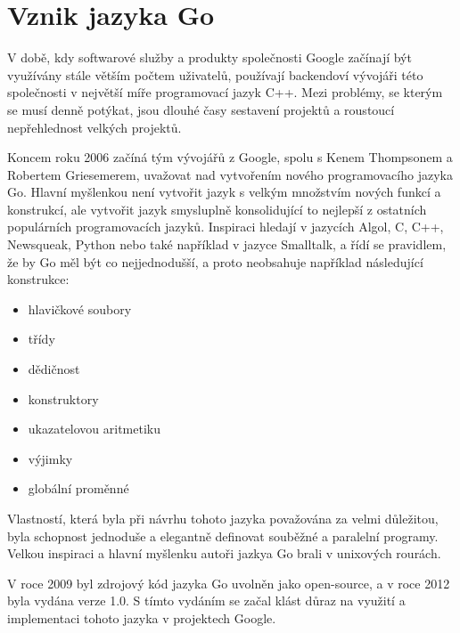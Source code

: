 \documentclass[12pt, a4paper]{article}
\let\oldsection\section
\renewcommand\section{\clearpage\oldsection}
\begin{document}
    \tableofcontents
    \pagebreak
    
    \section{Vznik jazyka Go}

 V době, kdy softwarové služby a produkty společnosti Google začínají být využívány stále větším počtem uživatelů, používají backendoví vývojáři této společnosti v největší míře programovací jazyk C++. Mezi problémy, se kterým se musí denně potýkat, jsou dlouhé časy sestavení projektů a roustoucí nepřehlednost velkých projektů.

Koncem roku 2006 začíná tým vývojářů z Google, spolu s Kenem Thompsonem a Robertem Griesemerem, uvažovat nad vytvořením nového programovacího jazyka Go.  Hlavní myšlenkou není vytvořit jazyk s velkým množstvím nových funkcí a konstrukcí, ale vytvořit jazyk smysluplně konsolidující to nejlepší z ostatních populárních programovacích jazyků. Inspiraci hledají v jazycích Algol, C, C++, Newsqueak, Python nebo také například v jazyce Smalltalk, a řídí se pravidlem, že by Go měl být co nejjednodušší, a proto neobsahuje například následující konstrukce:

\begin{itemize}
    \item hlavičkové soubory
    \item třídy
    \item dědičnost 
    \item konstruktory
    \item ukazatelovou aritmetiku
    \item výjimky
    \item globální proměnné
\end{itemize}

Vlastností, která byla při návrhu tohoto jazyka považována za velmi důležitou, byla schopnost jednoduše a elegantně definovat souběžné a paralelní programy. Velkou inspiraci a hlavní myšlenku autoři jazkya Go brali v unixových rourách.

V roce 2009 byl zdrojový kód jazyka Go uvolněn jako open-source, a v roce 2012 byla vydána verze 1.0. S tímto vydáním se začal klást důraz na využití a implementaci tohoto jazyka v projektech Google.
\end{document}

